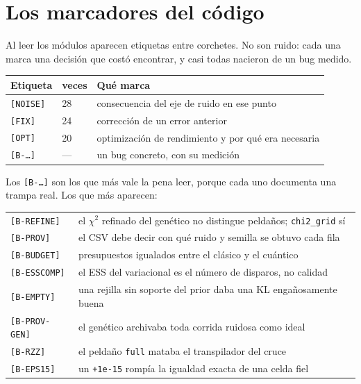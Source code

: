 \documentclass[11pt,a4paper]{article}
\newcommand{\M}[1]{\texttt{#1}}
\begin{document}
\section{Los marcadores del código}

Al leer los módulos aparecen etiquetas entre corchetes. No son ruido: cada
una marca una decisión que costó encontrar, y casi todas nacieron de un bug
medido.

\begin{center}
\small
\begin{tabular}{@{}llp{8.1cm}@{}}
\toprule
\textbf{Etiqueta} & \textbf{veces} & \textbf{Qué marca} \\
\midrule
\M{[NOISE]}     & 28 & consecuencia del eje de ruido en ese punto \\
\M{[FIX]}       & 24 & corrección de un error anterior \\
\M{[OPT]}       & 20 & optimización de rendimiento y por qué era necesaria \\
\M{[B-\ldots]}  & --- & un bug concreto, con su medición \\
\bottomrule
\end{tabular}
\end{center}

\noindent
Los \M{[B-\ldots]} son los que más vale la pena leer, porque cada uno
documenta una trampa real. Los que más aparecen:

\begin{center}
\small
\begin{tabular}{@{}lp{10.4cm}@{}}
\toprule
\M{[B-REFINE]} & el $\chi^2$ refinado del genético no distingue peldaños;
                 \M{chi2\_grid} sí \\
\M{[B-PROV]}   & el CSV debe decir con qué ruido y semilla se obtuvo cada
                 fila \\
\M{[B-BUDGET]} & presupuestos igualados entre el clásico y el cuántico \\
\M{[B-ESSCOMP]}& el ESS del variacional es el número de disparos, no
                 calidad \\
\M{[B-EMPTY]}  & una rejilla sin soporte del prior daba una KL
                 engañosamente buena \\
\M{[B-PROV-GEN]}& el genético archivaba toda corrida ruidosa como ideal \\
\M{[B-RZZ]}    & el peldaño \M{full} mataba el transpilador del cruce \\
\M{[B-EPS15]}  & un \M{+1e-15} rompía la igualdad exacta de una celda
                 fiel \\
\bottomrule
\end{tabular}
\end{center}
\end{document}
